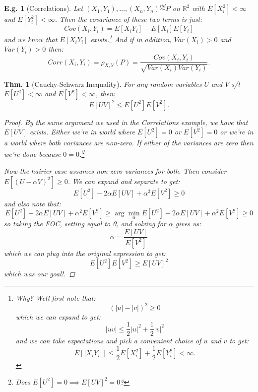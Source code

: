 \documentclass{tufte-book}
\theoremstyle{mytheoremstyle}
\newtheorem*{thm}{Thm.}
\theoremstyle{mylemstyle}
\theoremstyle{mydefstyle}
\newtheorem*{ex}{E.g.}
\begin{document}
\begin{ex}[Correlations] Let \((X_1, Y_1), \dots, (X_n, Y_n) \overset{iid}{\sim} P\) on \(\mathbb{R}^2\) with \(E[X_i^2] < \infty\) and \(E[Y_i^2] < \infty\). Then the covariance of these two terms is just:
	\[Cov(X_i, Y_i) = E[X_iY_i] - E[X_i]E[Y_i]\]
and we know that \(E[X_iY_i]\) exists.\footnote{Why? Well first note that:
	\[(|u| - |v|)^2 \ge 0\]
which we can expand to get:
	\[|uv| \le \frac{1}{2}|u|^2 + \frac{1}{2}|v|^2\]
and we can take expectations and pick a convenient choice of \(u\) and \(v\) to get:
	\[E[|X_i Y_i|] \le \frac{1}{2} E[X_i^2] + \frac{1}{2} E[Y_i^2] < \infty \text{.}\]} And if in addition, \(Var(X_i) > 0\) and \(Var(Y_i) > 0\) then:
	\[Corr(X_i, Y_i) = \rho_{X, Y}(P) = \frac{Cov(X_i, Y_i)}{\sqrt{Var(X_i)Var(Y_i)}}\text{.}\]
\end{ex}

\begin{thm}[Cauchy-Schwarz Inequality] For any random variables \(U\) and \(V\) s/t \(E[U^2] < \infty\) and \(E[V^2] < \infty\), then:
	\[E[UV]^2 \le E[U^2]E[V^2] \text{.}\]
	\begin{proof} By the same argument we used in the Correlations example, we have that \(E[UV]\) exists. Either we're in world where \(E[U^2] = 0\) or \(E[V^2] = 0\) or we're in a world where both variances are non-zero. If either of the variances are zero then we're done because \(0 = 0\).\footnote{Does \(E[U^2] = 0 \implies E[UV]^2 = 0\)?}
	
	Now the hairier case assumes non-zero variances for both. Then consider \(E[(U - \alpha V)^2] \ge 0\). We can expand and separate to get:
		\[E[U^2] - 2\alpha E[UV] + \alpha^2 E[V^2] \ge 0\]
	and also note that:
		\[E[U^2] - 2\alpha E[UV] + \alpha^2 E[V^2] \ge \arg \min_{\alpha} E[U^2] - 2\alpha E[UV] + \alpha^2 E[V^2] \ge 0\]
	so taking the FOC, setting equal to 0, and solving for \(\alpha\) gives us:
		\[\alpha = \frac{E[UV]}{E[V^2]}\]
	which we can plug into the original expression to get:
		\[E[U^2] E[V^2] \ge E[UV]^2\]
	which was our goal!.
	\end{proof}
\end{thm}
\end{document}
